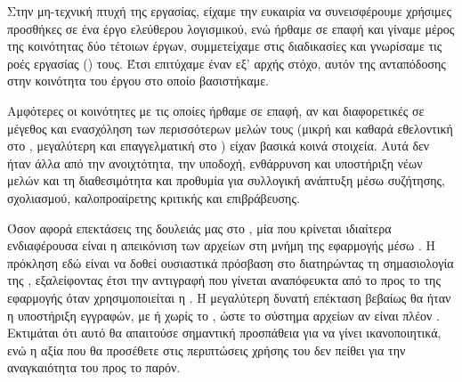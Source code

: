 
Στην μη-τεχνική πτυχή της εργασίας, είχαμε την ευκαιρία να συνεισφέρουμε
χρήσιμες προσθήκες σε ένα έργο ελεύθερου λογισμικού, ενώ ήρθαμε σε επαφή και
γίναμε μέρος της κοινότητας δύο τέτοιων έργων, συμμετείχαμε στις διαδικασίες
και γνωρίσαμε τις ροές εργασίας () τους. Έτσι επιτύχαμε έναν εξ'
αρχής στόχο, αυτόν της ανταπόδοσης στην κοινότητα του έργου στο οποίο
βασιστήκαμε.

Αμφότερες οι κοινότητες με τις οποίες ήρθαμε σε επαφή, αν και διαφορετικές σε
μέγεθος και ενασχόληση των περισσότερων μελών τους (μικρή και καθαρά εθελοντική
στο \osv{}, μεγαλύτερη και επαγγελματική στο \viofs{}) είχαν βασικά κοινά
στοιχεία. Αυτά δεν ήταν άλλα από την ανοιχτότητα, την υποδοχή, ενθάρρυνση και
υποστήριξη νέων μελών και τη διαθεσιμότητα και προθυμία για συλλογική ανάπτυξη
μέσω συζήτησης, σχολιασμού, καλοπροαίρετης κριτικής και επιβράβευσης.

Όσον αφορά επεκτάσεις της δουλειάς μας στο \osv{}, μία που κρίνεται ιδιαίτερα
ενδιαφέρουσα είναι η απεικόνιση των αρχείων στη μνήμη της εφαρμογής μέσω
\texttt{}. Η πρόκληση εδώ είναι να δοθεί ουσιαστικά πρόσβαση στο
 διατηρώντας τη σημασιολογία της \texttt{},
εξαλείφοντας έτσι την αντιγραφή που γίνεται αναπόφευκτα από το 
προς το  της εφαρμογής όταν χρησιμοποιείται η \texttt{}. Η
μεγαλύτερη δυνατή επέκταση βεβαίως θα ήταν η υποστήριξη εγγραφών, με ή χωρίς το
, ώστε το σύστημα αρχείων αν είναι πλέον .
Εκτιμάται ότι αυτό θα απαιτούσε σημαντική προσπάθεια για να γίνει ικανοποιητικά,
ενώ η αξία που θα προσέθετε στις περιπτώσεις χρήσης του \osv{} δεν πείθει για
την αναγκαιότητα του προς το παρόν.
